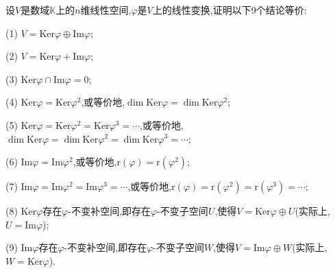 \documentclass[lang=cn,newtx,10pt,scheme=chinese]{elegantbook}
\begin{document}
\begin{proposition}\label{proposition:像空间和核空间的直和分解}
设\(V\)是数域\(\mathbb{K}\)上的\(n\)维线性空间,\(\varphi\)是\(V\)上的线性变换,证明以下9个结论等价:

(1) \(V=\text{Ker}\varphi\oplus\text{Im}\varphi\);

(2) \(V=\text{Ker}\varphi+\text{Im}\varphi\);

(3) \(\text{Ker}\varphi\cap\text{Im}\varphi = 0\);

(4) \(\text{Ker}\varphi=\text{Ker}\varphi^2\),或等价地,\(\dim\text{Ker}\varphi=\dim\text{Ker}\varphi^2\);

(5) \(\text{Ker}\varphi=\text{Ker}\varphi^2=\text{Ker}\varphi^3=\cdots\),或等价地,\(\dim\text{Ker}\varphi=\dim\text{Ker}\varphi^2=\dim\text{Ker}\varphi^3=\cdots\);

(6) \(\text{Im}\varphi=\text{Im}\varphi^2\),或等价地,\(\text{r}(\varphi)=\text{r}(\varphi^2)\);

(7) \(\text{Im}\varphi=\text{Im}\varphi^2=\text{Im}\varphi^3=\cdots\),或等价地,\(\text{r}(\varphi)=\text{r}(\varphi^2)=\text{r}(\varphi^3)=\cdots\);

(8) \(\text{Ker}\varphi\)存在\(\varphi\)-不变补空间,即存在\(\varphi\)-不变子空间\(U\),使得\(V=\text{Ker}\varphi\oplus U\)(实际上,$U = \text{Im}\varphi$);

(9) \(\text{Im}\varphi\)存在\(\varphi\)-不变补空间,即存在\(\varphi\)-不变子空间\(W\),使得\(V=\text{Im}\varphi\oplus W\)(实际上,$W = \text{Ker}\varphi$).
\end{proposition}
\end{document}
